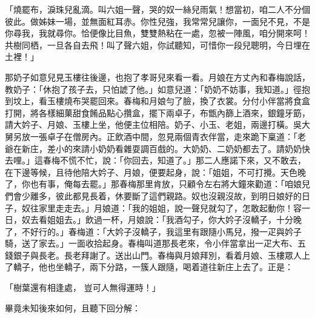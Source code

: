 \begin{showcontents}{}
「燒罷布，淚珠兒亂滴。叫六姐一聲，哭的奴一絲兒雨氣！想當初，咱二人不分個彼此。做姊妹一場，並無面紅耳赤。你性兒強，我常常兒讓你，一面兒不見，不是你尋我，我就尋你。恰便像比目魚，雙雙熱粘在一處，忽被一陣風，咱分開來呵！共樹同栖，一旦各自去飛！叫了聲六姐，你試聽知，可惜你一段兒聰明，今日埋在土裡！」

那奶子如意兒見玉樓往後邊，也抱了孝哥兒來看一看。月娘在方丈內和春梅說話，教奶子：「休抱了孩子去，只怕諕了他。」如意兒道：「奶奶不妨事，我知道。」徑抱到坟上，看玉樓燒布哭罷回來。春梅和月娘勻了臉，換了衣裳。分付小伴當將食盒打開，將各樣細菓甜食餚品點心攢盒，擺下兩卓子，布甑內篩上酒來，銀鐘牙筯，請大妗子、月娘、玉樓上坐，他便主位相陪。奶子、小玉、老姐，兩邊打橫。吳大舅另放一張卓子在僧房內。正飲酒中間，忽見兩個青衣伴當，走來跪下稟道：「老爺在新庄，差小的來請小奶奶看雜耍調百戲的。大奶奶、二奶奶都去了。請奶奶快去哩。」這春梅不慌不忙，說：「你回去，知道了。」那二人應諾下來，又不敢去，在下邊等候，且待他陪大妗子、月娘，便要起身，說：「姐姐，不可打攪。天色晚了，你也有事，俺每去罷。」那春梅那里肯放，只顧令左右將大鐘來勸道：「咱娘兒們會少離多，彼此都見長着，休要斷了這們親路。奴也沒親沒故，到明日娘好的日子，奴往家里走走去。」月娘道：「我的姐姐，說一聲兒就勾了，怎敢起動你！容一日，奴去看姐姐去。」飲過一杯，月娘說：「我酒勾子，你大妗子沒轎子，十分晚了，不好行的。」春梅道：「大妗子沒轎子，我這里有跟隨小馬兒，撥一疋與妗子騎，送了家去。」一面收拾起身。春梅叫道那長老來，令小伴當拿出一疋大布、五錢銀子與長老。長老拜謝了。送出山門。春梅與月娘拜別，看着月娘、玉樓眾人上了轎子，他也坐轎子，兩下分路，一簇人跟隨，喝着道往新庄上去了。正是：

「樹葉還有相逢處，  豈可人無得運時！」

畢竟未知後來如何，且聽下回分解：





\end{showcontents}


